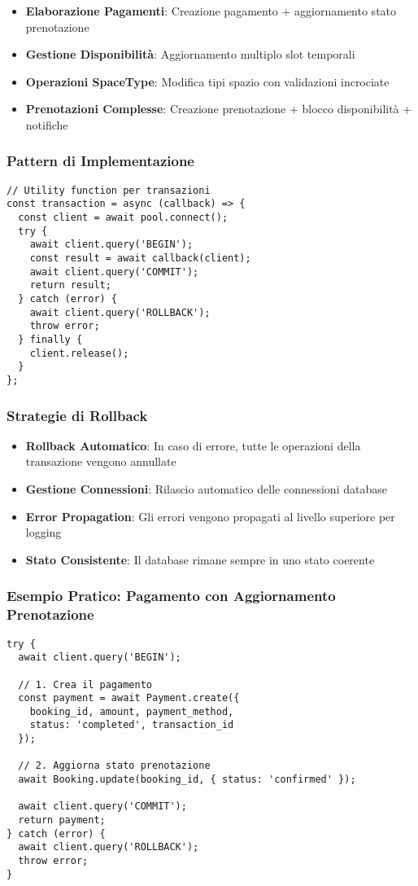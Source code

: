 \begin{itemize}
\item \textbf{Elaborazione Pagamenti}: Creazione pagamento + aggiornamento stato prenotazione
\item \textbf{Gestione Disponibilità}: Aggiornamento multiplo slot temporali
\item \textbf{Operazioni SpaceType}: Modifica tipi spazio con validazioni incrociate
\item \textbf{Prenotazioni Complesse}: Creazione prenotazione + blocco disponibilità + notifiche
\end{itemize}

\subsubsection{Pattern di Implementazione}
\begin{lstlisting}[caption=Esempio Transazione Automatica]
// Utility function per transazioni
const transaction = async (callback) => {
  const client = await pool.connect();
  try {
    await client.query('BEGIN');
    const result = await callback(client);
    await client.query('COMMIT');
    return result;
  } catch (error) {
    await client.query('ROLLBACK');
    throw error;
  } finally {
    client.release();
  }
};
\end{lstlisting}

\subsubsection{Strategie di Rollback}
\begin{itemize}
\item \textbf{Rollback Automatico}: In caso di errore, tutte le operazioni della transazione vengono annullate
\item \textbf{Gestione Connessioni}: Rilascio automatico delle connessioni database
\item \textbf{Error Propagation}: Gli errori vengono propagati al livello superiore per logging
\item \textbf{Stato Consistente}: Il database rimane sempre in uno stato coerente
\end{itemize}

\subsubsection{Esempio Pratico: Pagamento con Aggiornamento Prenotazione}
\begin{lstlisting}[caption=Transazione Pagamento Completa]
try {
  await client.query('BEGIN');
  
  // 1. Crea il pagamento
  const payment = await Payment.create({
    booking_id, amount, payment_method, 
    status: 'completed', transaction_id
  });
  
  // 2. Aggiorna stato prenotazione
  await Booking.update(booking_id, { status: 'confirmed' });
  
  await client.query('COMMIT');
  return payment;
} catch (error) {
  await client.query('ROLLBACK');
  throw error;
}
\end{lstlisting}


